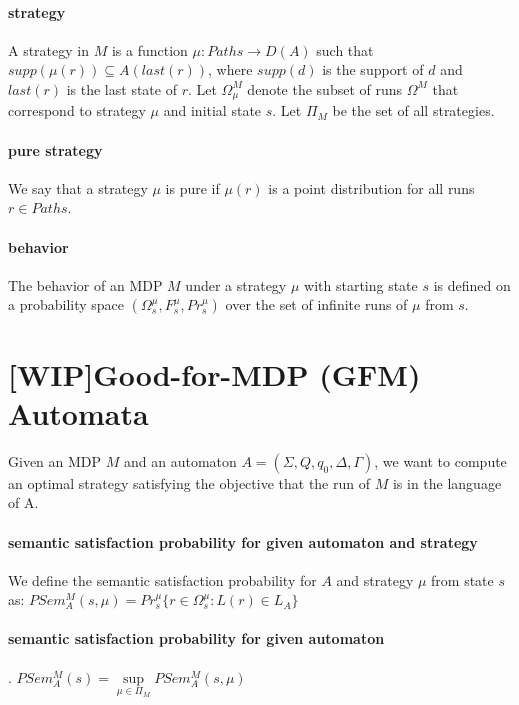 \documentclass[
	digital
nolof, nolot
]{fithesis3}
\begin{document}
		\paragraph{strategy}
		A strategy in $M$ is a
		function $\mu:Paths \rightarrow D(A)$
		such that $supp(\mu(r))\subseteq A(last(r))$,
		where $supp(d)$ is the support of $d$ and
		$last(r)$ is the last state of $r$.
		Let $\Omega^M_\mu$ denote the subset of runs $\Omega^M$
		that correspond to strategy $\mu$ and initial state $s$.
		Let $\Pi_M$ be the set of all strategies.
		\paragraph{pure strategy}
		We say that a strategy $\mu$ is pure
		if $\mu(r)$ is a point distribution for all runs $r \in Paths$.
		\paragraph{behavior}
		The behavior of an MDP $M$
		under a strategy $\mu$ with starting state $s$ is defined
		on a probability space $(\Omega_s^\mu, F_s^\mu, Pr_s^\mu)$
		over the set of infinite runs of $\mu$ from $s$.
		
		\section{[WIP]Good-for-MDP (GFM) Automata}
		Given an MDP $M$ and an
		automaton $A=(\Sigma, Q, q_0, \Delta, \Gamma)$, we want to compute an optimal strategy satisfying the objective that the run of $M$
		is in the language of A.
		\paragraph{semantic satisfaction probability for given automaton and strategy}
		We define the semantic satisfaction probability for $A$
		and strategy $\mu$ from state $s$ as:\newline
		$PSem_A^M(s,\mu)=Pr_s^\mu\{r \in\Omega_s^\mu:L(r)\in L_A  \}$
		\paragraph{semantic satisfaction probability for given automaton}
		.\newline
		$PSem_A^M(s)=\underset{\mu \in \Pi_M}{\sup} PSem_A^M(s, \mu)$
\end{document}
